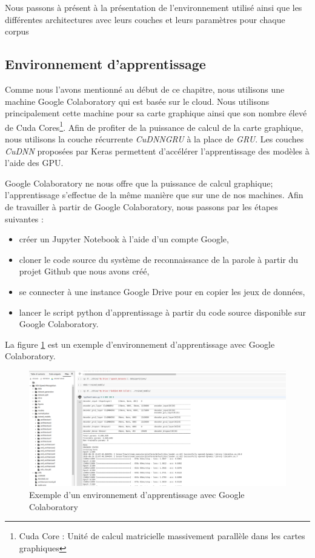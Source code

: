 Nous passons à présent à la présentation de l'environnement utilisé ainsi que les différentes architectures avec leurs couches et leurs paramètres pour chaque corpus

\subsection{Environnement d'apprentissage}
Comme nous l'avons mentionné au début de ce chapitre, nous utilisons une machine Google Colaboratory \cite{colab} qui est basée sur le cloud. Nous utilisons principalement cette machine pour sa carte graphique ainsi que son nombre élevé de Cuda Cores\footnote{Cuda Core : Unité de calcul matricielle massivement parallèle dans les cartes graphiques}. Afin de profiter de la puissance de calcul de la carte graphique, nous utilisons la couche récurrente \textit{CuDNNGRU} à la place de \textit{GRU}. Les couches \textit{CuDNN} proposées par Keras permettent d'accélérer l'apprentissage des modèles à l'aide des GPU.

Google Colaboratory ne nous offre que la puissance de calcul graphique; l'apprentissage s'effectue de la même manière que sur une de nos machines. Afin de travailler à partir de Google Colaboratory, nous passons par les étapes suivantes : 
\begin{itemize}
    \item créer un Jupyter Notebook à l'aide d'un compte Google,
    \item cloner le code source du système de reconnaissance de la parole à partir du projet Github que nous avons créé,
    \item se connecter à une instance Google Drive pour en copier les jeux de données,
    \item lancer le script python d'apprentissage à partir du code source disponible sur Google Colaboratory. \\
\end{itemize}

La figure \ref{Colab} est un exemple d'environnement d'apprentissage avec Google Colaboratory.

\begin{figure}[H]
    \centering
    \includegraphics[width=450pt]{images/chap4/Collab.png}
    \caption{Exemple d'un environnement d'apprentissage avec Google Colaboratory}
    \label{Colab}
\end{figure}

